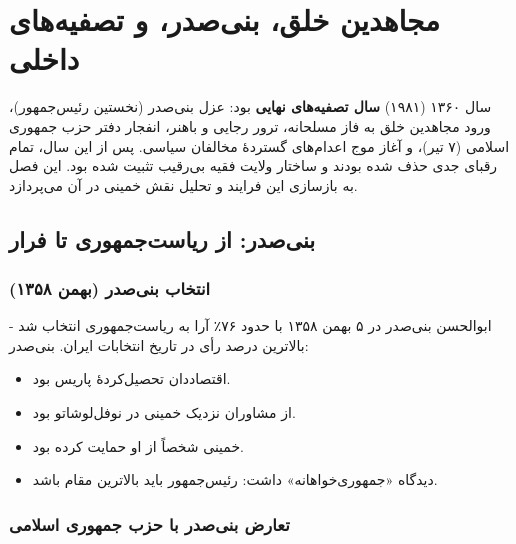 \documentclass[12pt,a4paper]{book}
\newcommand{\keyword}[1]{\textbf{\textcolor{cPrimary}{#1}}}
\begin{document}
\chapter{مجاهدین خلق، بنی‌صدر، و تصفیه‌های داخلی}
\label{chap:f66c37}


\begin{infoBox}
سال ۱۳۶۰ (۱۹۸۱) \keyword{سال تصفیه‌های نهایی} بود: عزل بنی‌صدر (نخستین رئیس‌جمهور)، ورود مجاهدین خلق به فاز مسلحانه، ترور رجایی و باهنر، انفجار دفتر حزب جمهوری اسلامی (۷ تیر)، و آغاز موج اعدام‌های گستردهٔ مخالفان سیاسی. پس از این سال، تمام رقبای جدی حذف شده بودند و ساختار ولایت فقیه بی‌رقیب تثبیت شده بود. این فصل به بازسازی این فرایند و تحلیل نقش خمینی در آن می‌پردازد.
\end{infoBox}

\section{بنی‌صدر: از ریاست‌جمهوری تا فرار}

\subsection{انتخاب بنی‌صدر (بهمن ۱۳۵۸)}

ابوالحسن بنی‌صدر در ۵ بهمن ۱۳۵۸ با حدود ۷۶٪ آرا به ریاست‌جمهوری انتخاب شد - بالاترین درصد رأی در تاریخ انتخابات ایران. بنی‌صدر:

\begin{itemize}[label=\textcolor{cPrimary}{$\blacktriangleright$}, rightmargin=2em]
    \item اقتصاددان تحصیل‌کردهٔ پاریس بود.
    \item از مشاوران نزدیک خمینی در نوفل‌لوشاتو بود.
    \item خمینی شخصاً از او حمایت کرده بود.
    \item دیدگاه «جمهوری‌خواهانه» داشت: رئیس‌جمهور باید بالاترین مقام باشد.
\end{itemize}

\subsection{تعارض بنی‌صدر با حزب جمهوری اسلامی}
\end{document}
